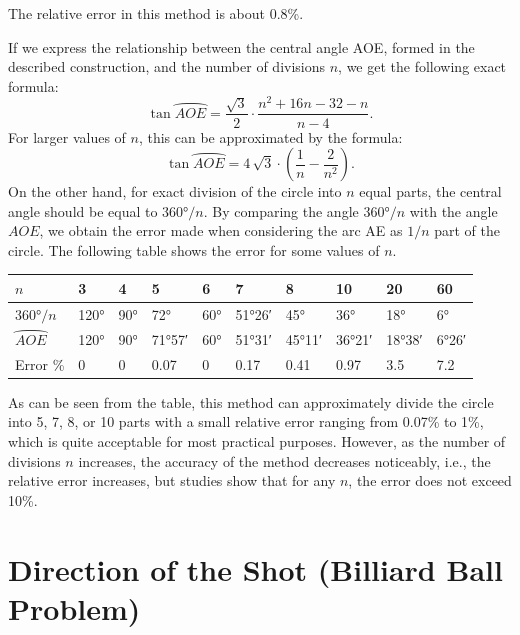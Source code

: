 The relative error in this method is about 0.8\%.


If we express the relationship between the central angle AOE, formed in the described construction, and the number of divisions \( n \), we get the following exact formula:
\begin{equation*}%
\tan \wideparen{AOE} = \frac{\sqrt{3}}{2} \cdot \frac{n^2 + 16n - 32 - n}{n - 4}.
\end{equation*}
For larger values of \( n \), this can be approximated by the formula:
\begin{equation*}%
\tan \wideparen{AOE} = 4 \, \sqrt{3} \cdot \left(\frac{1}{n} - \frac{2}{n^2}\right).
\end{equation*}
On the other hand, for exact division of the circle into \( n \) equal parts, the central angle should be equal to \(\ang{360}/n \). By comparing the angle  \(\ang{360}/n \) with the angle $AOE$, we obtain the error made when considering the arc AE as \( 1/n \) part of the circle. The following table shows the error for some values of \( n \).

\begin{table}
\centering
\begin{small}
\begin{tabular}{p{1cm}lllllllll}
\toprule
$n$	& 3	& 4	& 5	& 6	& 7	& 8	& 10	 & 20 & 60 \\
\midrule
$\ang{360}/n$ &	\ang{120} & 	\ang{90} & 	\ang{72} & 	\ang{60} & 	\ang{51;26}	& \ang{45} & \ang{36} & \ang{18} & \ang{6}\\
$\wideparen{AOE}$	&	\ang{120} & 	\ang{90} & 	\ang{71;57} & 	\ang{60} & 	\ang{51;31}	& \ang{45;11} & \ang{36;21} & \ang{18;38} & \ang{6;26}\\
Error \% & 0 & 0 & 0.07 & 0 & 0.17 & 0.41 & 0.97 &  3.5 & 7.2 \\
\bottomrule
\end{tabular}
\end{small}
\end{table}

As can be seen from the table, this method can approximately divide the circle into 5, 7, 8, or 10 parts with a small relative error ranging from 0.07\% to 1\%, which is quite acceptable for most practical purposes. However, as the number of divisions \( n \) increases, the accuracy of the method decreases noticeably, i.e., the relative error increases, but studies show that for any \( n \), the error does not exceed 10\%.




\section[Billiard Ball Problem]{Direction of the Shot (Billiard Ball Problem)}
\label{sec-10.7}

